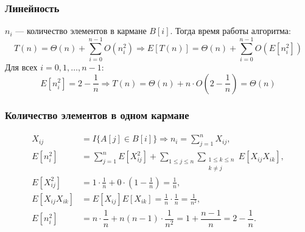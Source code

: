 \documentclass[hyperref={unicode=true}]{beamer}
\begin{document}
\frame
{
  \frametitle{Линейность}
  $n_i$ --- количество элементов в кармане $B[i]$. Тогда время работы алгоритма:
  \[
  T(n) = \Theta(n) + \sum_{i=0}^{n-1}O(n_i^2) \Rightarrow
  E[T(n)] = \Theta(n) + \sum_{i=0}^{n-1}O(E[n_i^2])
  \]
  Для всех $i=0, 1, \ldots, n-1$:
  \[
  E[n_i^2] = 2 - \frac{1}{n} \Rightarrow T(n) = \Theta(n)+n\cdot
  O\left(2-\frac{1}{n}\right) = \Theta(n)
  \]
}
\frame
{
  \frametitle{Количество элементов в одном кармане}
  \[
  \begin{split}
  X_{ij} &= I\{A[j]\in B[i]\} \Rightarrow n_i = \sum_{j=1}^nX_{ij},    \\
  E[n_i^2] &=\sum_{j=1}^nE[X_{ij}^2] + \sum_{1 \leq j \leq
    n}\sum_{\substack{1\leq k \leq n \\  k \neq j}}E[X_{ij}X_{ik}], \\
  E[X_{ij}^2] &=
  1\cdot\frac{1}{n}+0\cdot\left(1-\frac{1}{n}\right)=\frac{1}{n}, \\
  E[X_{ij}X_{ik}] &= E[X_{ij}]E[X_{ik}] =
  \frac{1}{n}\cdot\frac{1}{n}=\frac{1}{n^2}, \\
  E[n_i^2] &= n\cdot\dfrac{1}{n} + n(n-1)\cdot \dfrac{1}{n^2}=1+
  \dfrac{n-1}{n}= 2 - \dfrac{1}{n}.
  \end{split}
  \]
}
\end{document}
